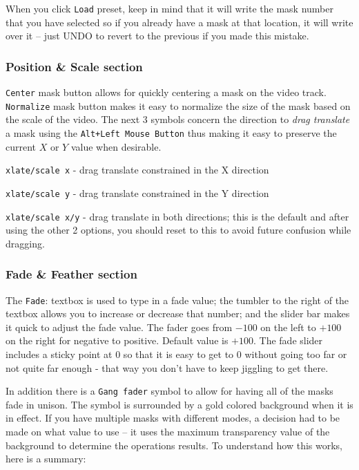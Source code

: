 When you click \texttt{Load} preset, keep in mind that it will write the mask number that you have selected so if you already have a mask at that location, it will write over it – just UNDO to revert to the previous if you made this mistake.

\subsubsection*{Position \& Scale section}%
\label{ssub:position_scale_section}

\texttt{Center} mask button allows for quickly centering a mask on the video track. 
\texttt{Normalize} mask button makes it easy to normalize the size of the mask based on the scale of the video. 
The next 3 symbols concern the direction to \textit{drag translate} a mask using the \texttt{Alt+Left Mouse Button} thus making it easy to preserve the current $X$ or $Y$ value when desirable.

\texttt{xlate/scale x}	- drag translate constrained in the X direction

\texttt{xlate/scale y}	- drag translate constrained in the Y direction

\texttt{xlate/scale x/y}	- drag translate in both directions; this is the default and after using the other 2 options, you should reset to this to avoid future confusion while dragging.

\subsubsection*{Fade \& Feather section}%
\label{ssub:fade_feather_section}

The \texttt{Fade}: textbox is used to type in a fade value; the tumbler to the right of the textbox allows you to increase or decrease that number; and the slider bar makes it quick to adjust the fade value.  The fader goes from $-100$ on the left to $+100$ on the right for negative to positive.  Default value is $+100$. The fade slider includes a sticky point at 0 so that it is easy to get to 0 without going too far or not quite far enough - that way you don’t have to keep jiggling to get there. 

In addition there is a \texttt{Gang fader} symbol to allow for having all of the masks fade in unison. The symbol is surrounded by a gold colored background when it is in effect.  If you have multiple masks with different modes, a decision had to be made on what value to use – it uses the maximum transparency value of the background to determine the operations results.  To understand how this works, here is a summary:

